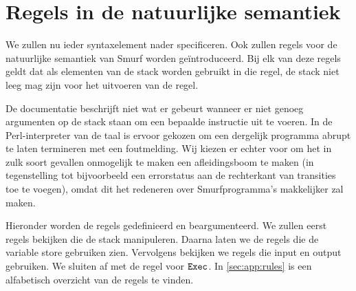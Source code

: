 \section{Regels in de natuurlijke semantiek}
\label{sec:rules}

We zullen nu ieder syntaxelement nader specificeren. Ook zullen regels voor de
natuurlijke semantiek van Smurf worden geïntroduceerd. Bij elk van deze regels
geldt dat als elementen van de stack worden gebruikt in die regel, de stack
niet leeg mag zijn voor het uitvoeren van de regel.

De documentatie \cite{safalra} beschrijft niet wat er gebeurt wanneer er niet
genoeg argumenten op de stack staan om een bepaalde instructie uit te voeren.
In de Perl-interpreter van de taal is ervoor gekozen om een dergelijk programma
abrupt te laten termineren met een foutmelding.  Wij kiezen er echter voor om
het in zulk soort gevallen onmogelijk te maken een afleidingsboom te maken (in
tegenstelling tot bijvoorbeeld een errorstatus aan de rechterkant van
transities toe te voegen), omdat dit het redeneren over Smurfprogramma's
makkelijker zal maken.

Hieronder worden de regels gedefinieerd en beargumenteerd. We zullen eerst
regels bekijken die de stack manipuleren. Daarna laten we de regels die de
variable store gebruiken zien. Vervolgens bekijken we regels die input en
output gebruiken. We sluiten af met de regel voor $\texttt{Exec}$. In
\autoref{sec:app:rules} is een alfabetisch overzicht van de regels te vinden.












